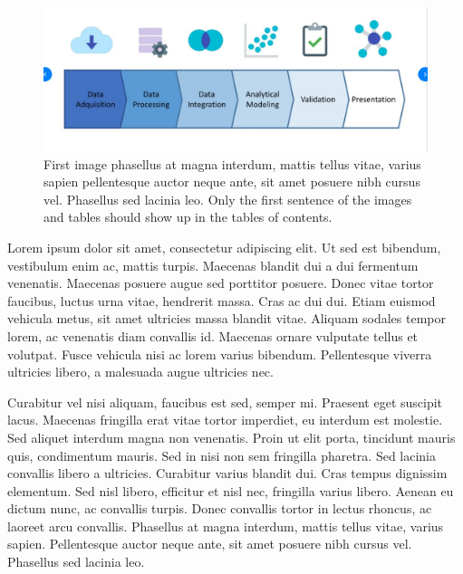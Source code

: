 \begin{figure}[!ht]
\centering
\includegraphics[scale=0.6]{Figs/Fig1.jpg}
\caption[First image phasellus at magna interdum, mattis tellus vitae, varius sapien pellentesque auctor neque ante, sit amet posuere nibh cursus vel]
{First image phasellus at magna interdum, mattis tellus vitae, varius sapien pellentesque auctor neque ante, sit amet posuere nibh cursus vel. Phasellus sed lacinia leo. Only the first sentence of the images and tables should show up in the tables of contents.}
\label{fig:figure1}
\end{figure}

Lorem ipsum dolor sit amet, consectetur adipiscing elit. Ut sed est bibendum, vestibulum enim ac, mattis turpis. Maecenas blandit dui a dui fermentum venenatis. Maecenas posuere augue sed porttitor posuere. Donec vitae tortor faucibus, luctus urna vitae, hendrerit massa. Cras ac dui dui. Etiam euismod vehicula metus, sit amet ultricies massa blandit vitae. Aliquam sodales tempor lorem, ac venenatis diam convallis id. Maecenas ornare vulputate tellus et volutpat. Fusce vehicula nisi ac lorem varius bibendum. Pellentesque viverra ultricies libero, a malesuada augue ultricies nec.

Curabitur vel nisi aliquam, faucibus est sed, semper mi. Praesent eget suscipit lacus. Maecenas fringilla erat vitae tortor imperdiet, eu interdum est molestie. Sed aliquet interdum magna non venenatis. Proin ut elit porta, tincidunt mauris quis, condimentum mauris. Sed in nisi non sem fringilla pharetra. Sed lacinia convallis libero a ultricies. Curabitur varius blandit dui. Cras tempus dignissim elementum. Sed nisl libero, efficitur et nisl nec, fringilla varius libero. Aenean eu dictum nunc, ac convallis turpis. Donec convallis tortor in lectus rhoncus, ac laoreet arcu convallis. Phasellus at magna interdum, mattis tellus vitae, varius sapien. Pellentesque auctor neque ante, sit amet posuere nibh cursus vel. Phasellus sed lacinia leo.